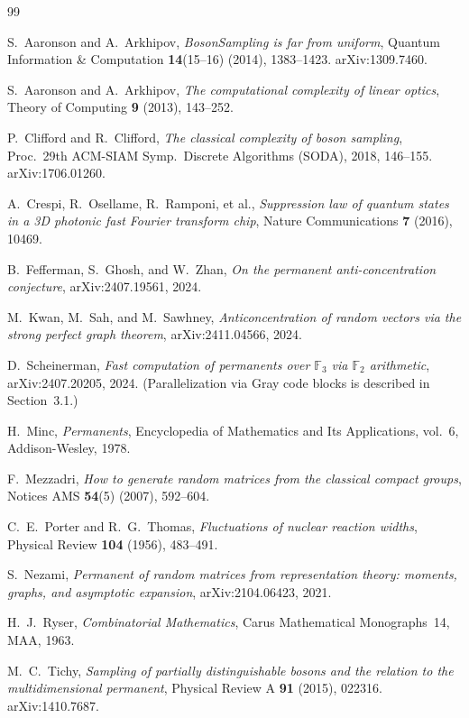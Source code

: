 \documentclass[11pt]{amsart}
\theoremstyle{definition}
\theoremstyle{remark}
\begin{document}
\begin{thebibliography}{99}

S.~Aaronson and A.~Arkhipov,
\emph{BosonSampling is far from uniform},
Quantum Information \& Computation \textbf{14}(15--16) (2014), 1383--1423.
arXiv:1309.7460.

S.~Aaronson and A.~Arkhipov,
\emph{The computational complexity of linear optics},
Theory of Computing \textbf{9} (2013), 143--252.

P.~Clifford and R.~Clifford,
\emph{The classical complexity of boson sampling},
Proc.\ 29th ACM-SIAM Symp.\ Discrete Algorithms (SODA), 2018, 146--155.
arXiv:1706.01260.

A.~Crespi, R.~Osellame, R.~Ramponi, et al.,
\emph{Suppression law of quantum states in a 3D photonic fast Fourier transform chip},
Nature Communications \textbf{7} (2016), 10469.

B.~Fefferman, S.~Ghosh, and W.~Zhan,
\emph{On the permanent anti-concentration conjecture},
arXiv:2407.19561, 2024.

M.~Kwan, M.~Sah, and M.~Sawhney,
\emph{Anticoncentration of random vectors via the strong perfect graph theorem},
arXiv:2411.04566, 2024.

D.~Scheinerman,
\emph{Fast computation of permanents over $\mathbb{F}_3$ via $\mathbb{F}_2$ arithmetic},
arXiv:2407.20205, 2024.
(Parallelization via Gray code blocks is described in Section~3.1.)

H.~Minc,
\emph{Permanents},
Encyclopedia of Mathematics and Its Applications, vol.~6,
Addison-Wesley, 1978.

F.~Mezzadri,
\emph{How to generate random matrices from the classical compact groups},
Notices AMS \textbf{54}(5) (2007), 592--604.

C.~E.~Porter and R.~G.~Thomas,
\emph{Fluctuations of nuclear reaction widths},
Physical Review \textbf{104} (1956), 483--491.

S.~Nezami,
\emph{Permanent of random matrices from representation theory: moments, graphs, and asymptotic expansion},
arXiv:2104.06423, 2021.

H.~J.~Ryser,
\emph{Combinatorial Mathematics},
Carus Mathematical Monographs~14, MAA, 1963.

M.~C.~Tichy,
\emph{Sampling of partially distinguishable bosons and the relation to the multidimensional permanent},
Physical Review A \textbf{91} (2015), 022316.
arXiv:1410.7687.


\end{thebibliography}
\end{document}
